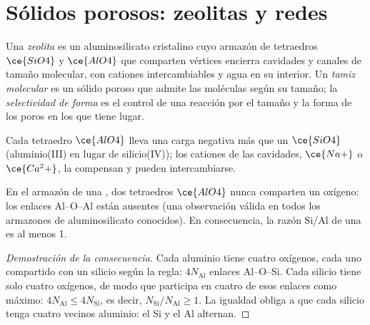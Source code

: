 \section{Sólidos porosos: zeolitas y redes}

\begin{definition}[Zeolitas]\label{def:b3:inorganic-materials:zeolite}
Una \emph{zeolita} es un aluminosilicato cristalino cuyo
armazón de tetraedros $\ce{SiO4}$ y $\ce{AlO4}$ que comparten vértices encierra cavidades y
canales de tamaño molecular, con cationes intercambiables y agua en su interior. Un
\emph{tamiz molecular} es un sólido poroso que admite
las moléculas según su tamaño; la \emph{selectividad de forma}
es el control de una reacción por el tamaño y la forma de los poros en los
que tiene lugar.
\end{definition}

Cada tetraedro $\ce{AlO4}$ lleva una carga negativa más que un $\ce{SiO4}$
(aluminio(III) en lugar de silicio(IV)); los cationes de las cavidades, $\ce{Na+}$ o $\ce{Ca^2+}$,
la compensan y pueden intercambiarse.

\begin{proposition}\label{prop:b3:inorganic-materials:lowenstein}
En el armazón de una , dos tetraedros $\ce{AlO4}$ nunca comparten un oxígeno: los enlaces Al--O--Al
están ausentes (una observación válida en todos los armazones de aluminosilicato conocidos). En
consecuencia, la razón Si/Al de una  es al menos 1.
\end{proposition}

\begin{proof}[Demostración de la consecuencia]
Cada aluminio tiene cuatro oxígenos, cada uno compartido con un silicio según la regla:
$4N_{\mathrm{Al}}$ enlaces Al--O--Si. Cada silicio tiene solo cuatro oxígenos, de modo que participa en
cuatro de esos enlaces como máximo: $4N_{\mathrm{Al}} \le 4N_{\mathrm{Si}}$, es decir, $N_{\mathrm{Si}}/N_{\mathrm{Al}} \ge 1$. La igualdad obliga a que cada
silicio tenga cuatro vecinos aluminio: el Si y el Al alternan.
\end{proof}

